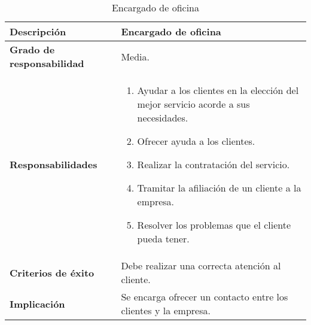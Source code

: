 \documentclass[12pt,spanish]{article}
\begin{document}

\begin{table}[H]
\begin{center}
\begin{tabular}{|l|m{10cm}|}
\hline
\textbf{Descripción} & Encargado de oficina \\
\hline
\textbf{Grado de responsabilidad} & Media. \\
\hline
\textbf{Responsabilidades} & 
\begin{minipage}{10cm}
    \vskip 1pt
    \begin{enumerate}
   		\item Ayudar a los clientes en la elección del mejor servicio acorde a sus necesidades.
   		\item Ofrecer ayuda a los clientes.
   		\item Realizar la contratación del servicio.
   		\item Tramitar la afiliación de un cliente a la empresa.
   		\item Resolver los problemas que el cliente pueda tener.
   \end{enumerate}
   \vskip 1pt
 \end{minipage}\\ 
\hline
\textbf{Criterios de éxito} & Debe realizar una correcta atención al cliente.\\
\hline
\textbf{Implicación} & Se encarga ofrecer un contacto entre los clientes y la empresa. \\
\hline
\end{tabular}
\caption{Encargado de oficina}
\end{center}
\end{table}
\end{document}
